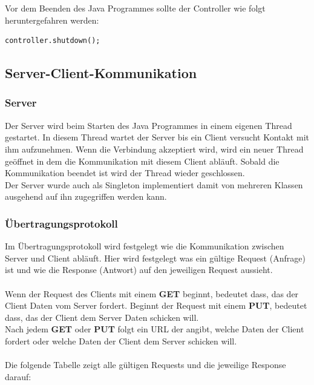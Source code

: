 Vor dem Beenden des Java Programmes sollte der Controller wie folgt heruntergefahren werden:
\begin{lstlisting}[style=JavaStyle]
	controller.shutdown();
\end{lstlisting}

\newpage

\subsection{Server-Client-Kommunikation}
\subsubsection{Server}
Der Server wird beim Starten des Java Programmes in einem eigenen Thread gestartet. In diesem Thread wartet der Server bis ein Client versucht Kontakt mit ihm aufzunehmen. Wenn die Verbindung akzeptiert wird, wird ein neuer Thread geöffnet in dem die Kommunikation mit diesem Client abläuft. Sobald die Kommunikation beendet ist wird der Thread wieder geschlossen. 
\\ Der Server wurde auch als Singleton implementiert damit von mehreren Klassen ausgehend auf ihn zugegriffen werden kann.

\subsubsection{Übertragungsprotokoll}
Im Übertragungsprotokoll wird festgelegt wie die Kommunikation zwischen Server und Client abläuft. Hier wird festgelegt was ein gültige Request (Anfrage) ist und wie die Response (Antwort) auf den jeweiligen Request aussieht. 
\\ \\
Wenn der Request des Clients mit einem \textbf{GET} beginnt, bedeutet dass, das der Client Daten vom Server fordert. Beginnt der Request mit einem \textbf{PUT}, bedeutet dass, das der Client dem Server Daten schicken will.
\\ Nach jedem \textbf{GET} oder \textbf{PUT} folgt ein URL der angibt, welche Daten der Client fordert oder welche Daten der Client dem Server schicken will.
\\ \\
Die folgende Tabelle zeigt alle gültigen Requests und die jeweilige Response darauf:

